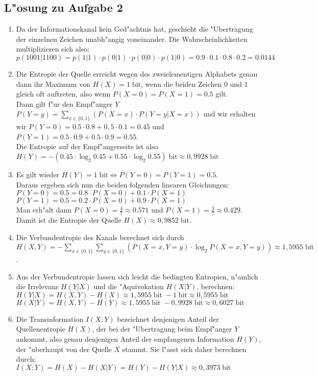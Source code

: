 \documentclass[10pt,oneside,onecolumn,a4paper,german,titlepage]{article}
\begin{document}
\subsection*{L"osung zu Aufgabe 2}
\begin{enumerate}
\item Da der Informationskanal kein Ged"achtnis hat, geschieht die "Ubertragung der
einzelnen Zeichen unabh"angig voneinander. Die Wahrscheinlichkeiten multiplizieren
sich also:\\
$p(1001|1100) = p(1|1) \cdot p(0|1) \cdot p(0|0) \cdot p(1|0) = 0.9 \cdot 0.1 \cdot
0.8 \cdot 0.2 = 0.0144$
\item Die Entropie der Quelle erreicht wegen des zweielementigen Alphabets genau dann
ihr Maximum von $H(X) = 1 \; \mbox{bit}$, wenn die beiden Zeichen $0$ und $1$ gleich
oft auftreten, also wenn $P(X=0) = P(X=1) = 0.5$ gilt.\\
Dann gilt f"ur den Empf"anger $Y$ $P(Y=y) = \sum\limits_{x \in \{0,1\}}(P(X=x) \cdot
P(Y=y|X=x))$ und wir erhalten wir $P(Y=0) = 0.5 \cdot 0.8 + 0,5 \cdot 0.1 = 0.45$ und
$P(Y=1) = 0.5 \cdot 0.9 + 0.5 \cdot 0.9 = 0.55$.\\
Die Entropie auf der Empf"angerseite ist also $H(Y) = -(0.45 \cdot \log_2{0.45} +
0.55 \cdot \log_2{0.55}) \; \mbox{bit} \approx 0,9928 \; \mbox{bit}$
\item Es gilt wieder $H(Y) = 1 \; \mbox{bit} \Leftrightarrow P(Y = 0) = P(Y = 1) =
0.5$.\\
Daraus ergeben sich nun die beiden folgenden linearen Gleichungen:\\
$P(Y=0) = 0.5 = 0.8 \cdot P(X=0) + 0.1 \cdot P(X=1)$\\
$P(Y=1) = 0.5 = 0.2 \cdot P(X=0) + 0.9 \cdot P(X=1)$\\
Man erh"alt dann $P(X=0) = \frac{4}{7} \approx 0.571$ und $P(X=1) = \frac{3}{7}
\approx 0.429$.\\
Damit ist die Entropie der Quelle $H(X) \approx 0,9852 \; \mbox{bit}$.
\item Die Verbundentropie des Kanals berechnet sich durch\\
$H(X,Y) = -\sum\limits_{x \in \{0,1\}}\sum\limits_{y \in \{0,1\}}(P(X=x,Y=y) \cdot
\log_2{P(X=x,Y=y)}) \approx 1,5955 \; \mbox{bit}$.
\item Aus der Verbundentropie lassen sich leicht die bedingten Entropien, n"amlich
die Irrelevanz $H(Y|X)$ und die "Aquivokation $H(X|Y)$, berechnen:\\
$H(Y|X) = H(X,Y) - H(X) \approx 1,5955 \; \mbox{bit} \; -1 \; \mbox{bit}
\approx 0,5955 \; \mbox{bit}$\\
$H(X|Y) = H(X,Y) - H(Y) \approx 1,5955 \; \mbox{bit} \; -0,9928 \; \mbox{bit}
\approx 0,6027 \; \mbox{bit}$
\item Die Transinformation $I(X;Y)$ bezeichnet denjenigen Anteil der Quellenentropie
$H(X)$, der bei der "Ubertragung beim Empf"anger $Y$ ankommt, also genau denjenigen
Anteil der empfangenen Information $H(Y)$, der "uberhaupt von der Quelle $X$ stammt.
Sie l"asst sich daher berechnen durch:\\
$I(X;Y) = H(X) - H(X|Y) = H(Y) - H(Y|X) \approx 0,3973 \; \mbox{bit}$
\end{enumerate}
\end{document}
